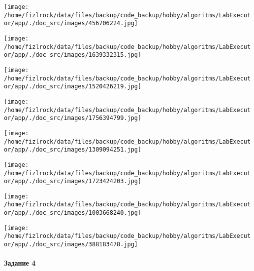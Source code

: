 \documentclass[a4paper, 12pt]{article}
\begin{document}
\texttt{[image: /home/fizlrock/data/files/backup/code\_backup/hobby/algoritms/LabExecutor/app/./doc\_src/images/456706224.jpg]}

\texttt{[image: /home/fizlrock/data/files/backup/code\_backup/hobby/algoritms/LabExecutor/app/./doc\_src/images/1639332315.jpg]}

\texttt{[image: /home/fizlrock/data/files/backup/code\_backup/hobby/algoritms/LabExecutor/app/./doc\_src/images/1520426219.jpg]}

\texttt{[image: /home/fizlrock/data/files/backup/code\_backup/hobby/algoritms/LabExecutor/app/./doc\_src/images/1756394799.jpg]}

\texttt{[image: /home/fizlrock/data/files/backup/code\_backup/hobby/algoritms/LabExecutor/app/./doc\_src/images/1309094251.jpg]}

\texttt{[image: /home/fizlrock/data/files/backup/code\_backup/hobby/algoritms/LabExecutor/app/./doc\_src/images/1723424203.jpg]}

\texttt{[image: /home/fizlrock/data/files/backup/code\_backup/hobby/algoritms/LabExecutor/app/./doc\_src/images/1003668240.jpg]}

\texttt{[image: /home/fizlrock/data/files/backup/code\_backup/hobby/algoritms/LabExecutor/app/./doc\_src/images/388183478.jpg]}
\pagebreak
\paragraph{Задание 4}
\end{document}
